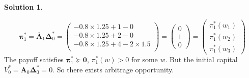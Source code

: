 \documentclass[a4paper, 10pt]{article}
\theoremstyle{definition}
\theoremstyle{hSol}
\newtheorem*{solution}{Solution}
\begin{document}
\begin{solution}
\begin{itemize}
	$$
	\bm{\pi}_{1}^* = \overline{\bm{A}}_1 \bm{\Delta}_{0}^* = \begin{pmatrix}
		-0.8 \times 1.25 + 1 - 0\\
		-0.8 \times 1.25 + 2 - 0\\
		-0.8 \times 1.25 + 4 - 2 \times 1.5\\
	\end{pmatrix} = \begin{pmatrix}
		0 \\
		1 \\
		0
	\end{pmatrix} = \begin{pmatrix}
		\pi_{1}^*(w_1) \\
		\pi_{1}^*(w_2) \\
		\pi_{1}^*(w_3)
	\end{pmatrix}
	$$
	The payoff satisfies $\bm{\pi}_{1}^*\succeq \bm{0}$, $\pi_{1}^*(w) > 0$ for some $w$. But the initial capital $V_0^* = \bm{A}_0 \bm{\Delta}_{0}^* = 0$. So there exists arbitrage opportunity.
\end{itemize}
\end{solution}
\end{document}
